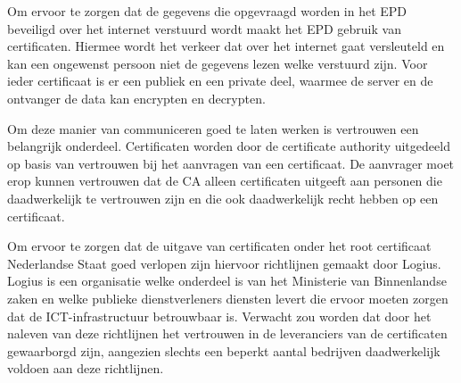 Om ervoor te zorgen dat de gegevens die opgevraagd worden in het EPD beveiligd over het internet verstuurd wordt maakt het EPD gebruik van certificaten. Hiermee wordt het verkeer dat over het internet gaat versleuteld en kan een ongewenst persoon niet de gegevens lezen welke verstuurd zijn. Voor ieder certificaat is er een publiek en een private deel, waarmee de server en de ontvanger de data kan encrypten en decrypten. 

Om deze manier van communiceren goed te laten werken is vertrouwen een belangrijk onderdeel. Certificaten worden door de certificate authority uitgedeeld op basis van vertrouwen bij het aanvragen van een certificaat. De aanvrager moet erop kunnen vertrouwen dat de CA alleen certificaten uitgeeft aan personen die daadwerkelijk te vertrouwen zijn en die ook daadwerkelijk recht hebben op een certificaat.

Om ervoor te zorgen dat de uitgave van certificaten onder het root certificaat Nederlandse Staat goed verlopen zijn hiervoor richtlijnen gemaakt door Logius\cite{bib.logius.pve}. Logius is een organisatie welke onderdeel is van het Ministerie van Binnenlandse zaken en welke publieke dienstverleners diensten levert die ervoor moeten zorgen dat de ICT-infrastructuur betrouwbaar is. Verwacht zou worden dat door het naleven van deze richtlijnen het vertrouwen in de leveranciers van de certificaten gewaarborgd zijn, aangezien slechts een beperkt aantal bedrijven daadwerkelijk voldoen aan deze richtlijnen. 

